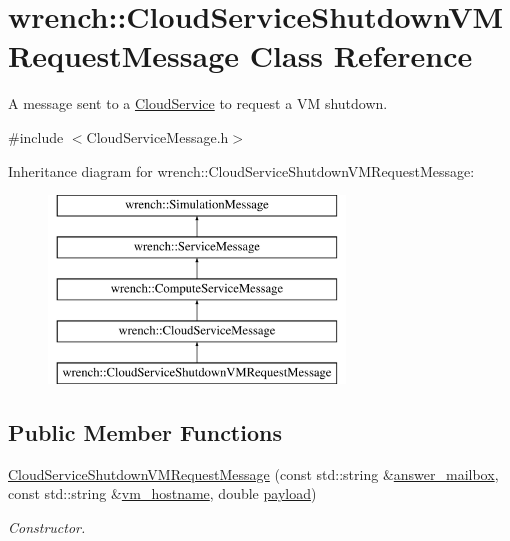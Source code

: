\hypertarget{classwrench_1_1_cloud_service_shutdown_v_m_request_message}{}\section{wrench\+:\+:Cloud\+Service\+Shutdown\+V\+M\+Request\+Message Class Reference}
\label{classwrench_1_1_cloud_service_shutdown_v_m_request_message}


A message sent to a \hyperlink{classwrench_1_1_cloud_service}{Cloud\+Service} to request a VM shutdown.  




{\ttfamily \#include $<$Cloud\+Service\+Message.\+h$>$}

Inheritance diagram for wrench\+:\+:Cloud\+Service\+Shutdown\+V\+M\+Request\+Message\+:\begin{figure}[H]
\begin{center}
\leavevmode
\includegraphics[height=5.000000cm]{classwrench_1_1_cloud_service_shutdown_v_m_request_message}
\end{center}
\end{figure}
\subsection*{Public Member Functions}
\begin{DoxyCompactItemize}
\item 
\hyperlink{classwrench_1_1_cloud_service_shutdown_v_m_request_message_aaab0418486b262131e7a73fa0ef21d8e}{Cloud\+Service\+Shutdown\+V\+M\+Request\+Message} (const std\+::string \&\hyperlink{classwrench_1_1_cloud_service_shutdown_v_m_request_message_af79c7ae3a239735ac51b86a8789d17e3}{answer\+\_\+mailbox}, const std\+::string \&\hyperlink{classwrench_1_1_cloud_service_shutdown_v_m_request_message_a8c7a69388cd9451095a2e1aa96dc4fdb}{vm\+\_\+hostname}, double \hyperlink{classwrench_1_1_simulation_message_a914f2732713f7c02898e66f05a7cb8a1}{payload})
\begin{DoxyCompactList}\small\item\em Constructor. \end{DoxyCompactList}\end{DoxyCompactItemize}
